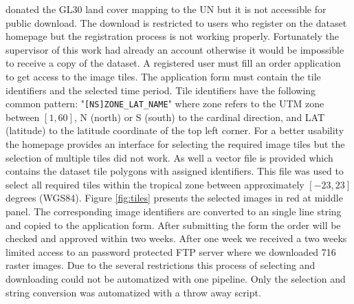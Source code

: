			\citeauthor{Chen2015} donated the \ac{GL30} land cover mapping to the \ac{UN} but it is not accessible for public download. The download is restricted to users who register on the dataset homepage but the registration process is not working properly. Fortunately the supervisor of this work had already an account otherwise it would be impossible to receive a copy of the dataset. A registered user must fill an order application to get access to the image tiles. The application form must contain the tile identifiers and the selected time period. Tile identifiers have the following common pattern: "\verb|[NS]ZONE_LAT_NAME|" where zone refers to the \ac{UTM} zone between $[1, 60]$, N (north) or S (south) to the cardinal direction, and LAT (latitude) to the latitude coordinate of the top left corner. For a better usability the homepage provides an interface for selecting the required image tiles but the selection of multiple tiles did not work. As well a vector file is provided which contains the dataset tile polygons with assigned identifiers. This file was used to select all required tiles within the tropical zone between approximately $[-23, 23]$ degrees (\ac{WGS84}). Figure \ref{fig:tiles} presents the selected images in red at middle panel. The corresponding image identifiers are converted to an single line string and copied to the application form. After submitting the form the order will be checked and approved within two weeks. After one week we received a two weeks limited access to an password protected \ac{FTP} server where we downloaded 716 raster images. Due to the several restrictions this process of selecting and downloading could not be automatized with one pipeline. Only the selection and string conversion was automatized with a throw away script.
